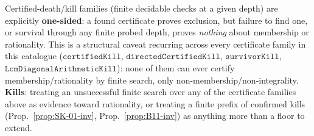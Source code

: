 \begin{obs}\label{prop:B11cert-kill}
Certified-death/kill families (finite decidable checks at a given depth) are explicitly
\textbf{one-sided}: a found certificate proves exclusion, but failure to find one, or survival
through any finite probed depth, proves \emph{nothing} about membership or rationality. This is a
structural caveat recurring across every certificate family in this catalogue
($\mathtt{certifiedKill}$, $\mathtt{directedCertifiedKill}$, $\mathtt{survivorKill}$,
$\mathtt{LcmDiagonalArithmeticKill}$): none of them can ever certify membership/rationality by
finite search, only non-membership/non-integrality. \textbf{Kills}: treating an unsuccessful finite
search over any of the certificate families above as evidence toward rationality, or treating a
finite prefix of confirmed kills (Prop.~\ref{prop:SK-01-inv}, Prop.~\ref{prop:B11-inv}) as
anything more than a floor to extend.
\ \ \\
\end{obs}
